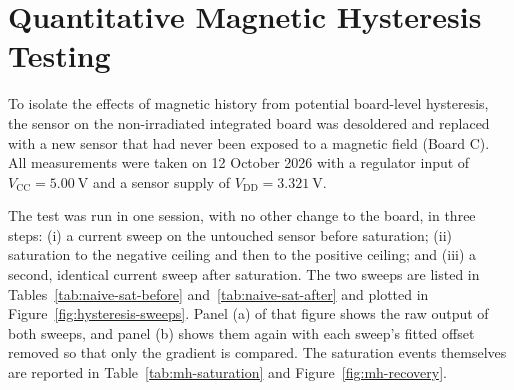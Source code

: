 \documentclass[12pt,a4paper]{article}
\begin{document}
\section{Quantitative Magnetic Hysteresis Testing}
\label{sec:hysteresis}


To isolate the effects of magnetic history from potential board-level hysteresis, the sensor on the non-irradiated integrated board was desoldered and replaced with a new sensor that had never been exposed to a magnetic field (Board C). All measurements were taken on 12 October 2026 with a regulator input of $V_{\text{CC}} = \SI{5.00}{\volt}$ and a sensor supply of $V_{\text{DD}} = \SI{3.321}{\volt}$.

The test was run in one session, with no other change to the board, in three steps: (i) a current sweep on the untouched sensor before saturation; (ii) saturation to the negative ceiling and then to the positive ceiling; and (iii) a second, identical current sweep after saturation. The two sweeps are listed in Tables~\ref{tab:naive-sat-before} and~\ref{tab:naive-sat-after} and plotted in Figure~\ref{fig:hysteresis-sweeps}. Panel (a) of that figure shows the raw output of both sweeps, and panel (b) shows them again with each sweep's fitted offset removed so that only the gradient is compared. The saturation events themselves are reported in Table~\ref{tab:mh-saturation} and Figure~\ref{fig:mh-recovery}.
\end{document}
